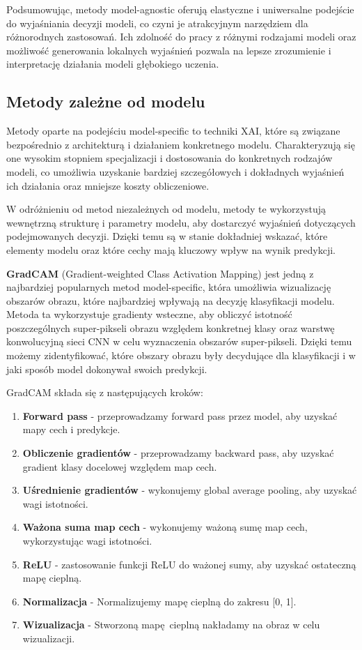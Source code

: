 \vspace{1cm}
Podsumowując, metody model-agnostic oferują elastyczne i uniwersalne podejście do wyjaśniania decyzji modeli, co czyni je atrakcyjnym narzędziem dla różnorodnych zastosowań.
Ich zdolność do pracy z różnymi rodzajami modeli oraz możliwość generowania lokalnych wyjaśnień pozwala na lepsze zrozumienie i interpretację działania modeli głębokiego uczenia.

\subsection*{Metody zależne od modelu}
Metody oparte na podejściu model-specific to techniki XAI, które są związane bezpośrednio z architekturą i działaniem konkretnego modelu.
Charakteryzują się one wysokim stopniem specjalizacji i dostosowania do konkretnych rodzajów modeli, co umożliwia uzyskanie bardziej szczegółowych i dokładnych wyjaśnień ich działania oraz mniejsze koszty obliczeniowe.

W odróżnieniu od metod niezależnych od modelu, metody te wykorzystują wewnętrzną strukturę i parametry modelu, aby dostarczyć wyjaśnień dotyczących podejmowanych decyzji.
Dzięki temu są w stanie dokładniej wskazać, które elementy modelu oraz które cechy mają kluczowy wpływ na wynik predykcji.

\textbf{GradCAM} \cite{Selvaraju_2019} (Gradient-weighted Class Activation Mapping) jest jedną z najbardziej popularnych metod model-specific, która umożliwia wizualizację obszarów obrazu, które najbardziej wpływają na decyzję klasyfikacji modelu.
Metoda ta wykorzystuje gradienty wsteczne, aby obliczyć istotność poszczególnych super-pikseli obrazu względem konkretnej klasy oraz warstwę konwolucyjną sieci CNN w celu wyznaczenia obszarów super-pikseli.
Dzięki temu możemy zidentyfikować, które obszary obrazu były decydujące dla klasyfikacji i w jaki sposób model dokonywał swoich predykcji.

GradCAM składa się z następujących kroków:
\begin{enumerate}
	\item \textbf{Forward pass} - przeprowadzamy forward pass przez model, aby uzyskać mapy cech i predykcje.
	\item \textbf{Obliczenie gradientów} - przeprowadzamy backward pass, aby uzyskać gradient klasy docelowej względem map cech.
	\item \textbf{Uśrednienie gradientów} - wykonujemy global average pooling, aby uzyskać wagi istotności.
	\item \textbf{Ważona suma map cech} - wykonujemy ważoną sumę map cech, wykorzystując wagi istotności.
	\item \textbf{ReLU} - zastosowanie funkcji ReLU do ważonej sumy, aby uzyskać ostateczną mapę cieplną.
	\item \textbf{Normalizacja} - Normalizujemy mapę cieplną do zakresu [0, 1].
	\item \textbf{Wizualizacja} - Stworzoną mapę cieplną nakładamy na obraz w celu wizualizacji.
\end{enumerate}

